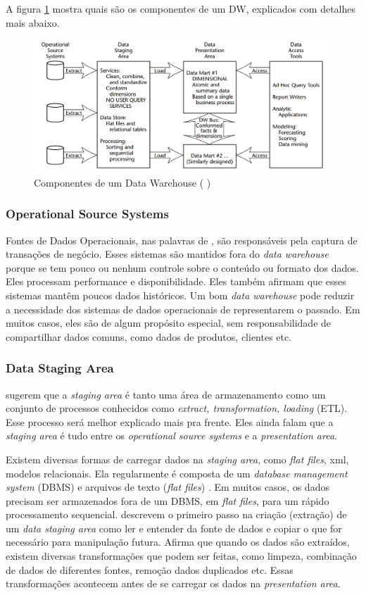A figura \ref{dwComponents} mostra quais são os componentes de um DW, explicados com detalhes mais abaixo.
\begin{figure}[H]
\centering
\includegraphics[height=5cm]{imagens/componentes_DW.png}
\caption{Componentes de um Data Warehouse (\citeauthor{kimball2002} \citeyear{kimball2002})}
\label{dwComponents}
\end{figure}

\subsubsection{Operational Source Systems}
Fontes de Dados Operacionais, nas palavras de , são responsáveis pela captura de transações de negócio. Esses sistemas são mantidos fora do \textit{data warehouse} porque se tem pouco ou nenhum controle sobre o conteúdo ou formato dos dados. Eles processam performance e disponibilidade. Eles também afirmam que esses sistemas mantêm poucos dados históricos. Um bom \textit{data warehouse} pode reduzir a necessidade dos sistemas de dados operacionais de representarem o passado. Em muitos casos, eles são de algum propósito especial, sem responsabilidade de compartilhar dados comuns, como dados de produtos, clientes etc.

\subsubsection{Data Staging Area}
 sugerem que a \textit{staging area} é tanto uma área de armazenamento como um conjunto de processos conhecidos como \textit{extract, transformation, loading} (ETL). Esse processo será melhor explicado mais pra frente. Eles ainda falam que a \textit{staging area} é tudo entre os \textit{operational source systems} e a \textit{presentation area}. 

Existem diversas formas de carregar dados na \textit{staging area}, como \textit{flat files}, xml, modelos relacionais. Ela regularmente é composta de um \textit{database management system} (DBMS) e arquivos de texto (\textit{flat files}) \citep{kimball2004}. Em muitos casos, os dados precisam ser armazenados fora de um DBMS, em \textit{flat files}, para um rápido processamento sequencial.
 descrevem o primeiro passo na criação (extração) de um \textit{data staging area} como ler e entender da fonte de dados e copiar o que for necessário para manipulação futura. Afirma que quando os dados são extraídos, existem diversas transformações que podem ser feitas, como limpeza, combinação de dados de diferentes fontes, remoção dados duplicados etc. Essas transformações acontecem antes de se carregar os dados na \textit{presentation area}.

